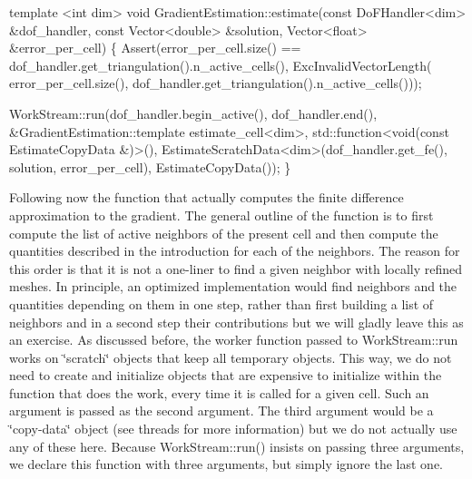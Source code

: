 \begin{DoxyCode}
\textcolor{keyword}{template} <\textcolor{keywordtype}{int} dim>
\textcolor{keywordtype}{void} GradientEstimation::estimate(\textcolor{keyword}{const} DoFHandler<dim> &dof\_handler,
                                  \textcolor{keyword}{const} Vector<double> &solution,
                                  Vector<float> &error\_per\_cell)
\{
    Assert(error\_per\_cell.size() ==
               dof\_handler.get\_triangulation().n\_active\_cells(),
           ExcInvalidVectorLength(
               error\_per\_cell.size(),
               dof\_handler.get\_triangulation().n\_active\_cells()));

    WorkStream::run(dof\_handler.begin\_active(), dof\_handler.end(),
                    &GradientEstimation::template estimate\_cell<dim>,
                    std::function<void(const EstimateCopyData &)>(),
                    EstimateScratchData<dim>(dof\_handler.get\_fe(), solution,
                                             error\_per\_cell),
                    EstimateCopyData());
\}
\end{DoxyCode}


Following now the function that actually computes the finite difference approximation to the gradient. The general outline of the function is to first compute the list of active neighbors of the present cell and then compute the quantities described in the introduction for each of the neighbors. The reason for this order is that it is not a one-\/liner to find a given neighbor with locally refined meshes. In principle, an optimized implementation would find neighbors and the quantities depending on them in one step, rather than first building a list of neighbors and in a second step their contributions but we will gladly leave this as an exercise. As discussed before, the worker function passed to Work\+Stream\+::run works on \char`\"{}scratch\char`\"{} objects that keep all temporary objects. This way, we do not need to create and initialize objects that are expensive to initialize within the function that does the work, every time it is called for a given cell. Such an argument is passed as the second argument. The third argument would be a \char`\"{}copy-\/data\char`\"{} object (see threads for more information) but we do not actually use any of these here. Because Work\+Stream\+::run() insists on passing three arguments, we declare this function with three arguments, but simply ignore the last one.

